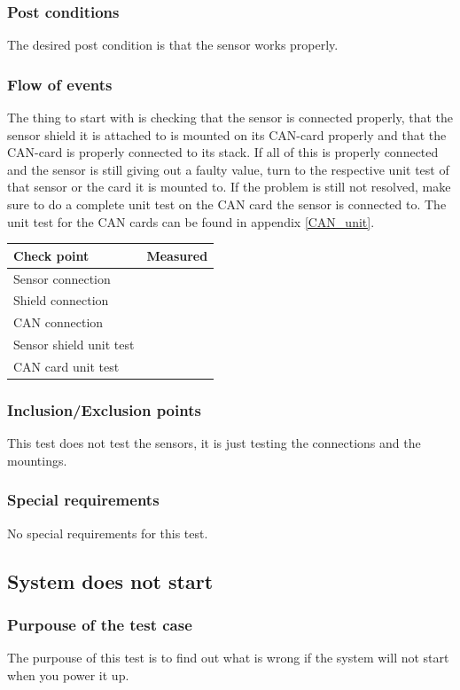 \subsubsection*{Post conditions}
The desired post condition is that the sensor works properly. 
\subsubsection*{Flow of events}
The thing to start with is checking that the sensor is connected properly, that the sensor shield it is attached to is mounted on its CAN-card properly and that the CAN-card is properly connected to its stack. If all of this is properly connected and the sensor is still giving out a faulty value, turn to the respective unit test of that sensor or the card it is mounted to. If the problem is still not resolved, make sure to do a complete unit test on the CAN card the sensor is connected to. The unit test for the CAN cards can be found in appendix \ref{CAN_unit}.

\begin{tabular}{| l | c |}
\hline
Check point & Measured \\ \hline
Sensor connection &  \\ \hline
Shield connection &  \\ \hline
CAN connection & \\ \hline
Sensor shield unit test & \\ \hline
CAN card unit test & \\ \hline
\end{tabular}   
\subsubsection*{Inclusion/Exclusion points}
This test does not test the sensors, it is just testing the connections and the mountings. 
\subsubsection*{Special requirements}
No special requirements for this test. 

\subsection{System does not start}
\label{nostart}
\subsubsection*{Purpouse of the test case}
The purpouse of this test is to find out what is wrong if the system will not start when you power it up. 
